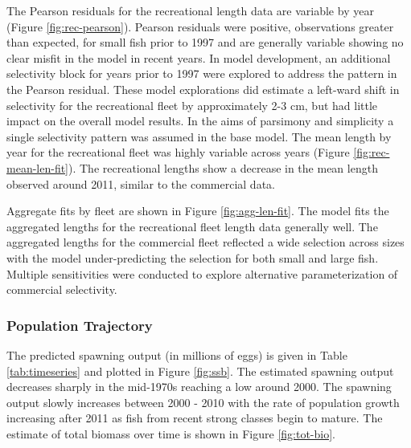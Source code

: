 \documentclass[11pt,
  english,
  a4paper,
]{article}
\begin{document}
\leavevmode\tagmcend\tagstructend\par


The Pearson residuals for the recreational length data are variable by year (Figure \ref{fig:rec-pearson}). Pearson residuals were positive, observations greater than expected, for small fish prior to 1997 and are generally variable showing no clear misfit in the model in recent years. In model development, an additional selectivity block for years prior to 1997 were explored to address the pattern in the Pearson residual. These model explorations did estimate a left-ward shift in selectivity for the recreational fleet by approximately 2-3 cm, but had little impact on the overall model results. In the aims of parsimony and simplicity a single selectivity pattern was assumed in the base model. The mean length by year for the recreational fleet was highly variable across years (Figure \ref{fig:rec-mean-len-fit}). The recreational lengths show a decrease in the mean length observed around 2011, similar to the commercial data.

\leavevmode\tagmcend\tagstructend\par


Aggregate fits by fleet are shown in Figure \ref{fig:agg-len-fit}. The model fits the aggregated lengths for the recreational fleet length data generally well. The aggregated lengths for the commercial fleet reflected a wide selection across sizes with the model under-predicting the selection for both small and large fish. Multiple sensitivities were conducted to explore alternative parameterization of commercial selectivity.

\leavevmode\tagmcend\tagstructend\par


\hypertarget{population-trajectory}{%
\subsubsection{Population Trajectory}\label{population-trajectory}}

\leavevmode\tagmcend\tagstructend


The predicted spawning output (in millions of eggs) is given in Table \ref{tab:timeseries} and plotted in Figure \ref{fig:ssb}. The estimated spawning output decreases sharply in the mid-1970s reaching a low around 2000. The spawning output slowly increases between 2000 - 2010 with the rate of population growth increasing after 2011 as fish from recent strong classes begin to mature. The estimate of total biomass over time is shown in Figure \ref{fig:tot-bio}.
\end{document}
